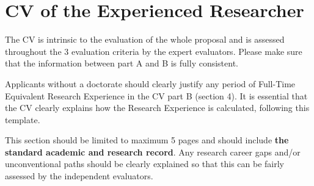 
\newpage
{}
\section{CV of the Experienced Researcher}
\label{sec:cv}

The CV is intrinsic to the evaluation of the whole proposal and is
assessed throughout the 3 evaluation criteria by the expert
evaluators. Please make sure that the information between part A
and B is fully consistent.

\medskip\noindent

Applicants without a doctorate should clearly justify any period
of Full-Time Equivalent Research Experience in the CV part B
(section 4). It is essential that the CV clearly explains how the
Research Experience is calculated, following this template.

\medskip

This section should be limited to maximum 5 pages and should
include \textbf{the standard academic and research record}. Any
research career gaps and/or unconventional paths should be clearly
explained so that this can be fairly assessed by the independent
evaluators.

